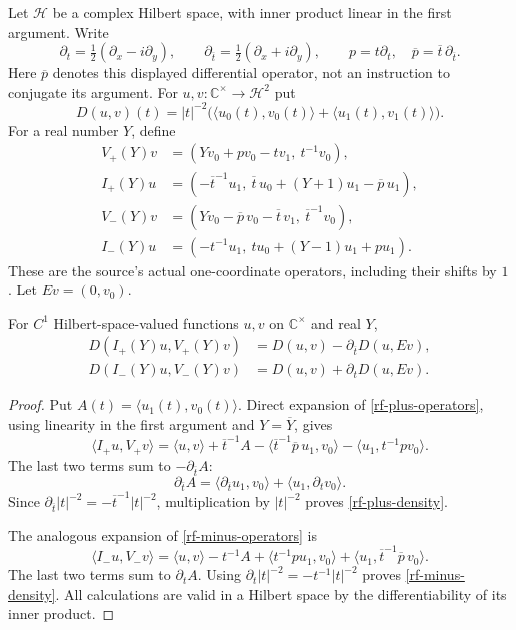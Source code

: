Let $\mathcal H$ be a complex Hilbert space, with inner product
linear in the first argument.  Write
\[
 \partial_t=\tfrac12(\partial_x-i\partial_y),\qquad
 \partial_{\overline t}=\tfrac12(\partial_x+i\partial_y),
 \qquad p=t\partial_t,\quad
 \overline p=\overline t\,\partial_{\overline t}.
\]
Here $\overline p$ denotes this displayed differential
operator, not an instruction to conjugate its argument.
For $u,v:\mathbb C^\times\to\mathcal H^2$ put
\[
 D(u,v)(t)=|t|^{-2}
              \bigl(\langle u_0(t),v_0(t)\rangle+
                    \langle u_1(t),v_1(t)\rangle\bigr).
\]
For a real number $Y$, define
\begin{align}
 V_+(Y)v&=(Yv_0+pv_0-tv_1,\ t^{-1}v_0),\nonumber\\
 I_+(Y)u&=(-\overline t^{-1}u_1,\
             \overline t\,u_0+(Y+1)u_1-\overline p\,u_1),
                    \label{rf-plus-operators}\\
 V_-(Y)v&=(Yv_0-\overline p\,v_0-\overline t\,v_1,\
                                      \overline t^{-1}v_0),\nonumber\\
 I_-(Y)u&=(-t^{-1}u_1,\
                    t u_0+(Y-1)u_1+p u_1).
                    \label{rf-minus-operators}
\end{align}
These are the source's actual one-coordinate operators, including
their shifts by $1$.  Let $Ev=(0,v_0)$.

\begin{lemma}\label{rf-one-letter}
For $C^1$ Hilbert-space-valued functions $u,v$ on
$\mathbb C^\times$ and real $Y$,
\begin{align}
 D(I_+(Y)u,V_+(Y)v)
      &=D(u,v)-\partial_{\overline t}D(u,Ev),\label{rf-plus-density}\\
 D(I_-(Y)u,V_-(Y)v)
      &=D(u,v)+\partial_tD(u,Ev).\label{rf-minus-density}
\end{align}
\end{lemma}

\begin{proof}
Put $A(t)=\langle u_1(t),v_0(t)\rangle$.
Direct expansion of \eqref{rf-plus-operators}, using
linearity in the first argument and $Y=\overline Y$, gives
\[
 \langle I_+u,V_+v\rangle
 =\langle u,v\rangle+\overline t^{-1}A
       -\langle\overline t^{-1}\overline p\,u_1,v_0\rangle
       -\langle u_1,t^{-1}p v_0\rangle.
\]
The last two terms sum to $-\partial_{\overline t}A$:
\[
 \partial_{\overline t}A
    =\langle\partial_{\overline t}u_1,v_0\rangle
       +\langle u_1,\partial_t v_0\rangle.
\]
Since
$\partial_{\overline t}|t|^{-2}
       =-\overline t^{-1}|t|^{-2}$,
multiplication by $|t|^{-2}$ proves \eqref{rf-plus-density}.

The analogous expansion of \eqref{rf-minus-operators} is
\[
 \langle I_-u,V_-v\rangle
 =\langle u,v\rangle-t^{-1}A
       +\langle t^{-1}p u_1,v_0\rangle
       +\langle u_1,\overline t^{-1}\overline p\,v_0\rangle.
\]
The last two terms sum to $\partial_tA$.
Using $\partial_t|t|^{-2}=-t^{-1}|t|^{-2}$ proves
\eqref{rf-minus-density}.  All calculations are valid in a
Hilbert space by the differentiability of its inner product.
\end{proof}

